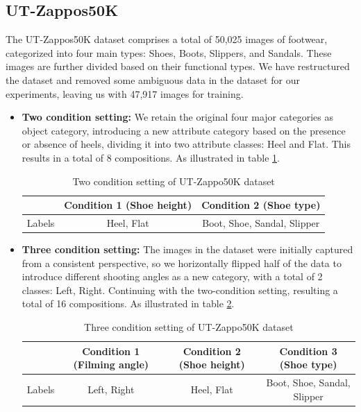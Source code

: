 \subsection{UT-Zappos50K}
The UT-Zappos50K dataset comprises a total of 50,025 images of footwear, categorized into four main types: Shoes, Boots, Slippers, and Sandals. These images are further divided based on their functional types. We have restructured the dataset and removed some ambiguous data in the dataset for our experiments, leaving us with 47,917 images for training.
\begin{itemize}
    \item \textbf{Two condition setting:} We retain the original four major categories as object category, introducing a new attribute category based on the presence or absence of heels, dividing it into two attribute classes: Heel and Flat. This results in a total of 8 compositions. As illustrated in table \ref{tab:twocondzappo}. 
    \begin{table} [H]
        \centering
        \begin{tabular}{c|c|c}
             & Condition 1 (Shoe height) & Condition 2 (Shoe type) \\
             \hline
             Labels & Heel, Flat & Boot, Shoe, Sandal, Slipper \\
        \end{tabular}
        \caption{Two condition setting of UT-Zappo50K dataset}
        \label{tab:twocondzappo}
    \end{table}
    \item \textbf{Three condition setting:} The images in the dataset were initially captured from a consistent perspective, so we horizontally flipped half of the data to introduce different shooting angles as a new category, with a total of 2 classes: Left, Right. Continuing with the two-condition setting, resulting a total of 16 compositions. As illustrated in table \ref{tab:threecondzappo}.
    \begin{table} [H]
        \centering
        \begin{tabular}{c|c|c|c}
             & Condition 1 (Filming angle) & Condition 2 (Shoe height) & Condition 3 (Shoe type)\\
             \hline
            Labels & Left, Right & Heel, Flat & Boot, Shoe, Sandal, Slipper \\
        \end{tabular}
        \caption{Three condition setting of UT-Zappo50K dataset}
        \label{tab:threecondzappo}
    \end{table}
\end{itemize}

